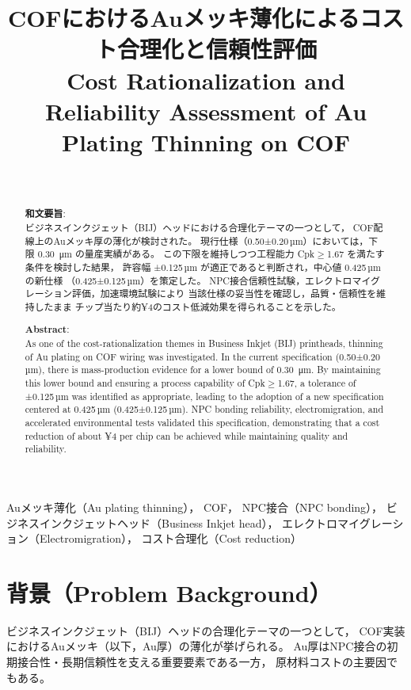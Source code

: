 \documentclass[conference]{IEEEtran}
\title{COFにおけるAuメッキ薄化によるコスト合理化と信頼性評価\\
\large Cost Rationalization and Reliability Assessment of Au Plating Thinning on COF}
\author{%
  \IEEEauthorblockN{三溝 真一（Shinichi Samizo)}\\
  \IEEEauthorblockA{独立系半導体研究者（元セイコーエプソン）\\
  Email: \href{mailto:shin3t72@gmail.com}{shin3t72@gmail.com}\\
  GitHub: \url{https://github.com/Samizo-AITL}}%
}
\begin{document}
\maketitle

\begin{abstract}
\textbf{和文要旨}:\\
ビジネスインクジェット（BIJ）ヘッドにおける合理化テーマの一つとして，
COF配線上のAuメッキ厚の薄化が検討された。
現行仕様（0.50±0.20\,µm）においては，下限 \SI{0.30}{\micro\metre} の量産実績がある。
この下限を維持しつつ工程能力 Cpk$\geq$1.67 を満たす条件を検討した結果，
許容幅 ±0.125\,µm が適正であると判断され，中心値 0.425\,µm の新仕様
（0.425±0.125\,µm）を策定した。
NPC接合信頼性試験，エレクトロマイグレーション評価，加速環境試験により
当該仕様の妥当性を確認し，品質・信頼性を維持したまま
チップ当たり約¥4のコスト低減効果を得られることを示した。

\medskip
\noindent\textbf{Abstract}:\\
As one of the cost-rationalization themes in Business Inkjet (BIJ) printheads,
thinning of Au plating on COF wiring was investigated.
In the current specification (0.50±0.20\,µm), there is mass-production evidence
for a lower bound of \SI{0.30}{\micro\metre}.
By maintaining this lower bound and ensuring a process capability of Cpk$\geq$1.67,
a tolerance of ±0.125\,µm was identified as appropriate,
leading to the adoption of a new specification centered at 0.425\,µm (0.425±0.125\,µm).
NPC bonding reliability, electromigration, and accelerated environmental tests
validated this specification, demonstrating that a cost reduction of about
¥4 per chip can be achieved while maintaining quality and reliability.
\end{abstract}

\begin{IEEEkeywords}
Auメッキ薄化（Au plating thinning），
COF，
NPC接合（NPC bonding），
ビジネスインクジェットヘッド（Business Inkjet head），
エレクトロマイグレーション（Electromigration），
コスト合理化（Cost reduction）
\end{IEEEkeywords}

\section{背景（Problem Background）}
ビジネスインクジェット（BIJ）ヘッドの合理化テーマの一つとして，
COF実装におけるAuメッキ（以下，Au厚）の薄化が挙げられる。
Au厚はNPC接合の初期接合性・長期信頼性を支える重要要素である一方，
原材料コストの主要因でもある。
\end{document}
